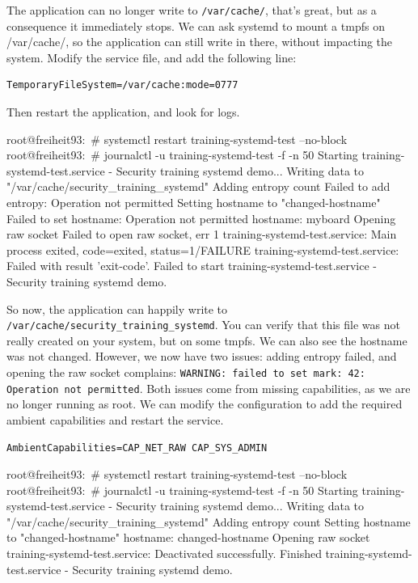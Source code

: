 The application can no longer write to \texttt{/var/cache/}, that's great, but
as a consequence it immediately stops.
We can ask systemd to mount a tmpfs on /var/cache/, so the application can still
write in there, without impacting the system.
Modify the service file, and add the following line:

\begin{verbatim}
TemporaryFileSystem=/var/cache:mode=0777
\end{verbatim}

Then restart the application, and look for logs.

\begin{bashinput}
root@freiheit93:~# systemctl restart training-systemd-test --no-block
root@freiheit93:~# journalctl -u training-systemd-test -f -n 50
Starting training-systemd-test.service - Security training systemd demo...
Writing data to "/var/cache/security_training_systemd"
Adding entropy count
Failed to add entropy: Operation not permitted
Setting hostname to "changed-hostname"
Failed to set hostname: Operation not permitted
hostname: myboard
Opening raw socket
Failed to open raw socket, err 1
training-systemd-test.service: Main process exited, code=exited, status=1/FAILURE
training-systemd-test.service: Failed with result 'exit-code'.
Failed to start training-systemd-test.service - Security training systemd demo.
\end{bashinput}

So now, the application can happily write to
\texttt{/var/cache/security\_training\_systemd}.
You can verify that this file was not really created on your system, but on some
tmpfs.
We can also see the hostname was not changed.
However, we now have two issues: adding entropy failed, and opening the raw socket
complains: \texttt{WARNING: failed to set mark: 42: Operation not permitted}.
Both issues come from missing capabilities, as we are no longer running as
root.
We can modify the configuration to add the required ambient capabilities and
restart the service.

\begin{verbatim}
AmbientCapabilities=CAP_NET_RAW CAP_SYS_ADMIN
\end{verbatim}

\begin{bashinput}
root@freiheit93:~# systemctl restart training-systemd-test --no-block
root@freiheit93:~# journalctl -u training-systemd-test -f -n 50
Starting training-systemd-test.service - Security training systemd demo...
Writing data to "/var/cache/security_training_systemd"
Adding entropy count
Setting hostname to "changed-hostname"
hostname: changed-hostname
Opening raw socket
training-systemd-test.service: Deactivated successfully.
Finished training-systemd-test.service - Security training systemd demo.
\end{bashinput}

